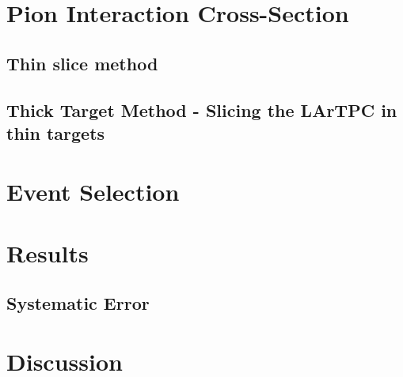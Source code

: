 \documentclass[%
 reprint,
 amsmath,amssymb,
 aps,
]{revtex4-1}
\begin{document}
\section{Pion Interaction Cross-Section}\label{sec:PiCrossSection}

\subsection{Thin slice method}\label{sec:ThinSlice}

\subsection{Thick Target Method - Slicing the LArTPC in thin targets}

\section{Event Selection}\label{sec:EventSelection}

\section{Results}\label{sec:Results}

\subsection{Systematic Error}\label{sec:systematics}


\section{Discussion}
\end{document}
